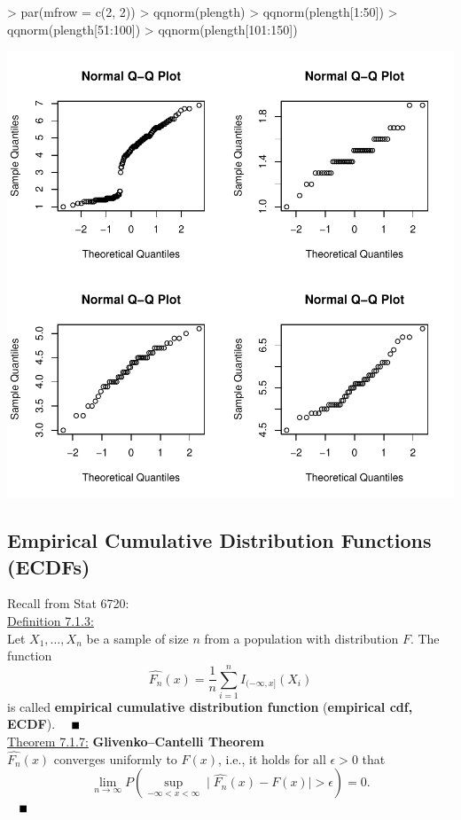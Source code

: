 \documentclass[12pt,letterpaper,final]{article}
\newcommand{\qedsymb}{\mbox{ }~\hfill~{\rule{2mm}{2mm}}}
\begin{document}
\begin{Schunk}
\begin{Sinput}
> par(mfrow = c(2, 2))
> qqnorm(plength)
> qqnorm(plength[1:50])
> qqnorm(plength[51:100])
> qqnorm(plength[101:150])
\end{Sinput}
\end{Schunk}
\includegraphics{lect_main-034}


\newpage


\subsection{Empirical Cumulative Distribution Functions (ECDFs)}


Recall from Stat 6720: \\

\underline{Definition 7.1.3:} \\
Let $X_1, \ldots, X_n$ be a sample of size $n$ from a population with
distribution $F$. The function
\[
\hat{F_n} (x) = \frac{1}{n} \displaystyle\sum_{i=1}^n
  I_{(-\infty, x]} (X_i)
\]
is called 
{\bf empirical cumulative distribution function} 
({\bf empirical cdf, ECDF}).
$\qedsymb$ \\


\underline{Theorem 7.1.7:}
{\bf Glivenko--Cantelli Theorem} \\
%
$\hat{F_n} (x)$ converges uniformly to $F(x)$, i.e., it holds
for all $\epsilon > 0$ that
\[
\displaystyle\lim_{n \rightarrow \infty}
  P(\sup_{-\infty < x < \infty} \mid \hat{F_n} (x) - F(x) \mid >
   \epsilon) = 0.
\]
$\qedsymb$
\end{document}
